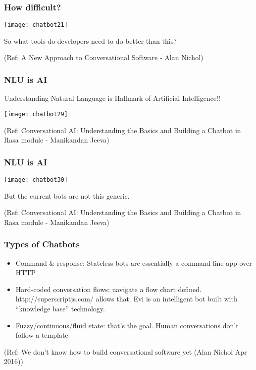  \begin{frame}[fragile]\frametitle{How difficult?}

\begin{center}
\texttt{[image: chatbot21]}

\end{center}

So what tools do developers need to do better than this?


{\tiny (Ref: A New Approach to Conversational Software - Alan Nichol)}
\end{frame}

\begin{frame}[fragile]\frametitle{NLU is AI}

Understanding Natural Language is Hallmark of Artificial Intelligence!!

\begin{center}
\texttt{[image: chatbot29]}
\end{center}

{\tiny (Ref: Conversational AI: Understanding the Basics and Building a Chatbot in Rasa module - Manikandan Jeeva)}
\end{frame}

\begin{frame}[fragile]\frametitle{NLU is AI}

\begin{center}
\texttt{[image: chatbot30]}
\end{center}

But the current bots are not this generic.

{\tiny (Ref: Conversational AI: Understanding the Basics and Building a Chatbot in Rasa module - Manikandan Jeeva)}
\end{frame}


\begin{frame}[fragile]\frametitle{Types of Chatbots}
\begin{itemize}
\item Command \& response: Stateless bots are essentially a command line app over HTTP
\item Hard-coded conversation flows: navigate a flow chart defined. http://superscriptjs.com/ allows that. Evi is an intelligent bot built with ``knowledge base'' technology.
\item Fuzzy/continuous/fluid state: that's the goal. Human conversations don't follow a template
\end{itemize}

{\tiny (Ref: We don't know how to build conversational software yet (Alan Nichol Apr 2016))}
\end{frame}

